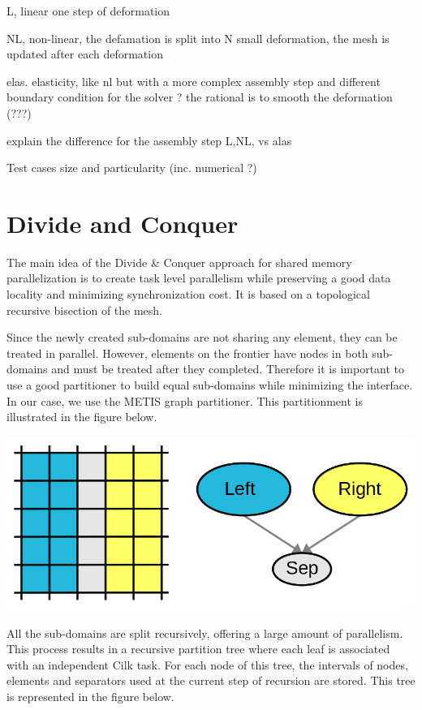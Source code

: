 \documentclass{IOS-Book-Article}
\begin{document}
L, linear one step of deformation

NL, non-linear, the defamation is split into N small deformation, the mesh is updated after each deformation

elas. elasticity, like nl but with a more complex assembly step and different boundary condition for the solver ? the rational is to smooth the deformation (???)


explain the difference for the assembly step L,NL, vs alas

Test cases size and particularity (inc. numerical ?)



\section{Divide and Conquer}

The main idea of the Divide \& Conquer approach for shared memory parallelization is to create task level parallelism while preserving a good data locality and
minimizing synchronization cost. It is based on a topological recursive bisection of the mesh.

Since the newly created sub-domains are not sharing any element, they can be treated in parallel.
However, elements on the frontier have nodes in both sub-domains and must be treated after they completed.
Therefore it is important to use a good partitioner to build equal sub-domains while minimizing the interface. In our case, we use the METIS graph partitioner.
This partitionment is illustrated in the figure below.
\begin{center}
 \includegraphics[scale=0.25]{DC_approach.png}
\end{center}
All the sub-domains are split recursively, offering a large amount of parallelism.
This process results in a recursive partition tree where each leaf is associated with an independent Cilk task.
For each node of this tree, the intervals of nodes, elements and separators used at the current step of recursion are stored.
This tree is represented in the figure below.
\end{document}
